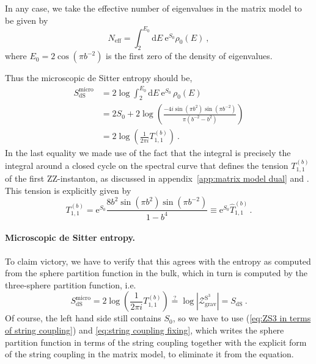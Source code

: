 \documentclass[12pt,a4paper]{article}
\newcommand{\be}{\begin{equation}}
\newcommand{\ee}{\end{equation}}
\renewcommand\d{\text{d}}
\begin{document}
In any case, we take the effective number of eigenvalues in the matrix model to be given by
\be \label{eq:Neff def}
N_\text{eff}= \int_2^{E_0}\d E \ \mathrm{e}^{S_0} \rho_0(E)~,
\ee
where $E_0=2 \cos(\pi b^{-2})$ is the first zero of the density of eigenvalues. 

Thus the microscopic de Sitter entropy should be, 
\begin{align} 
S_{\text{dS}}^\text{micro}&=2\log \int_2^{E_0} \d E\ \mathrm{e}^{S_0}\, \rho_0(E) \nonumber\\
&=2S_0+ 2\log\left( \frac{-4i \sin(\pi b^2) \sin(\pi b^{-2})}{\pi(b^{-2}-b^2)}\right) \nonumber\\ 
&=2\log \left(\frac{1}{2\pi i} T_{1,1}^{(b)}\right)~.\label{eq:SdS matrix}
\end{align}
In the last equality we made use of the fact that the integral is precisely the integral around a closed cycle on the spectral curve that defines the tension $T_{1,1}^{(b)}$ of the first ZZ-instanton, as discussed in appendix~\ref{app:matrix model dual} and \cite{paper3}. This tension is explicitly given by
\begin{equation}\label{eq:tension explicit form}
    T_{1,1}^{(b)} = \mathrm{e}^{S_0}\frac{8b^2 \sin(\pi b^2)\sin(\pi b^{-2})}{1-b^4} \equiv \mathrm{e}^{S_0} \widehat{T}_{1,1}^{(b)}\, .
\end{equation}

\paragraph{Microscopic de Sitter entropy.} To claim victory, we have to verify that this agrees with the entropy as computed from the sphere partition function in the bulk, which in turn is computed by the three-sphere partition function, i.e.
\be \label{eq:SdS tension logZS3}
S_{\text{dS}}^\text{micro}=2\log \left(\frac{1}{2\pi i} T_{1,1}^{(b)}\right) \overset{?}{=} \log |\mathcal{Z}_{\text{grav}}^{\text{S}^3}|=S_{\text{dS}}~.
\ee
Of course, the left hand side still contains $S_0$, so we have to use (\ref{eq:ZS3 in terms of string coupling}) and \eqref{eq:string coupling fixing}, which writes the sphere partition function in terms of the string coupling together with the explicit form of the string coupling in the matrix model, to eliminate it from the equation.
\end{document}
